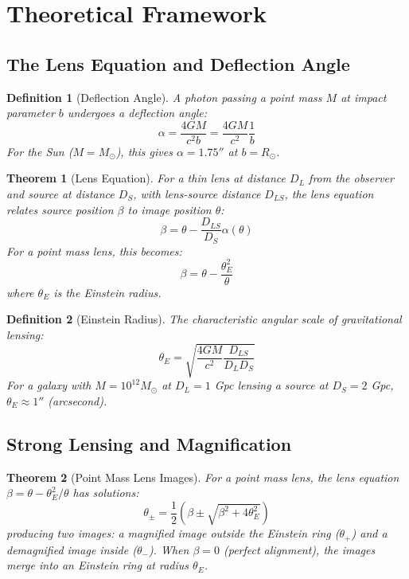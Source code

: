 \documentclass[11pt,a4paper]{article}
\newtheorem{definition}{Definition}[section]
\newtheorem{theorem}{Theorem}[section]
\begin{document}
\section{Theoretical Framework}

\subsection{The Lens Equation and Deflection Angle}

\begin{definition}[Deflection Angle]
A photon passing a point mass $M$ at impact parameter $b$ undergoes a deflection angle:
\begin{equation}
\alpha = \frac{4GM}{c^2 b} = \frac{4GM}{c^2} \frac{1}{b}
\end{equation}
For the Sun ($M = M_\odot$), this gives $\alpha = 1.75''$ at $b = R_\odot$.
\end{definition}

\begin{theorem}[Lens Equation]
For a thin lens at distance $D_L$ from the observer and source at distance $D_S$, with
lens-source distance $D_{LS}$, the lens equation relates source position $\beta$ to
image position $\theta$:
\begin{equation}
\beta = \theta - \frac{D_{LS}}{D_S} \alpha(\theta)
\end{equation}
For a point mass lens, this becomes:
\begin{equation}
\beta = \theta - \frac{\theta_E^2}{\theta}
\end{equation}
where $\theta_E$ is the Einstein radius.
\end{theorem}

\begin{definition}[Einstein Radius]
The characteristic angular scale of gravitational lensing:
\begin{equation}
\theta_E = \sqrt{\frac{4GM}{c^2} \frac{D_{LS}}{D_L D_S}}
\end{equation}
For a galaxy with $M = 10^{12} M_\odot$ at $D_L = 1$ Gpc lensing a source at $D_S = 2$ Gpc,
$\theta_E \approx 1''$ (arcsecond).
\end{definition}

\subsection{Strong Lensing and Magnification}

\begin{theorem}[Point Mass Lens Images]
For a point mass lens, the lens equation $\beta = \theta - \theta_E^2/\theta$ has solutions:
\begin{equation}
\theta_\pm = \frac{1}{2}\left(\beta \pm \sqrt{\beta^2 + 4\theta_E^2}\right)
\end{equation}
producing two images: a magnified image outside the Einstein ring ($\theta_+$) and a
demagnified image inside ($\theta_-$). When $\beta = 0$ (perfect alignment), the images
merge into an Einstein ring at radius $\theta_E$.
\end{theorem}
\end{document}
